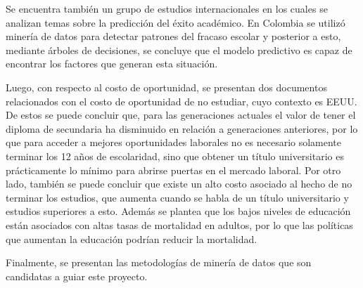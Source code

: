 Se encuentra también un grupo de estudios internacionales en los cuales se analizan temas sobre la predicción del éxito académico. En Colombia se utilizó minería de datos para detectar patrones del fracaso escolar y posterior a esto, mediante árboles de decisiones, se concluye que el modelo predictivo es capaz de encontrar los factores que generan esta situación. 

Luego, con respecto al costo de oportunidad, se presentan dos documentos relacionados con el costo de oportunidad de no estudiar, cuyo contexto es EEUU. De estos se puede concluir que, para las generaciones actuales el valor de tener el diploma de secundaria ha disminuido en relación a generaciones anteriores, por lo que para acceder a mejores oportunidades laborales no es necesario solamente terminar los 12 años de escolaridad, sino que obtener un título universitario es prácticamente lo mínimo para abrirse puertas en el mercado laboral. Por otro lado, también se puede concluir que existe un alto costo asociado al hecho de no terminar los estudios, que aumenta cuando se habla de un título universitario y estudios superiores a esto. Además se plantea que los bajos niveles de educación están asociados con altas tasas de mortalidad en adultos, por lo que las políticas que aumentan la educación podrían reducir la mortalidad.

Finalmente, se presentan las metodologías de minería de datos que son candidatas a guiar este proyecto. 
